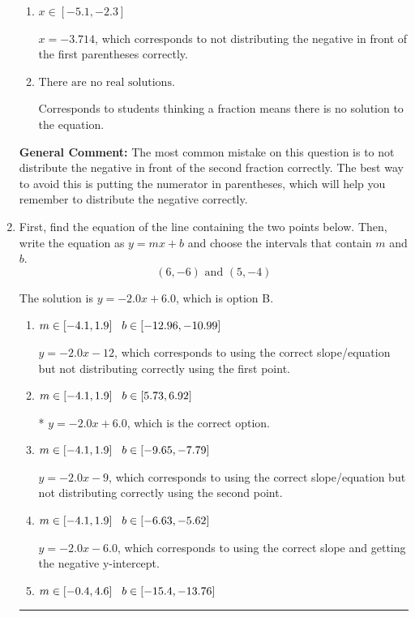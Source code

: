 \documentclass{extbook}[14pt]
\newcommand{\litem}[1]{\item #1

\rule{\textwidth}{0.4pt}}
\begin{document}
\begin{enumerate}
{\begin{enumerate}[label=\Alph*.]
$x = 3.714$, which corresponds to not distributing the negative in front of the second parentheses correctly.
\item \( x \in [-5.1, -2.3] \)

$x = -3.714$, which corresponds to not distributing the negative in front of the first parentheses correctly.
\item \( \text{There are no real solutions.} \)

Corresponds to students thinking a fraction means there is no solution to the equation.
\end{enumerate}

\textbf{General Comment:} The most common mistake on this question is to not distribute the negative in front of the second fraction correctly. The best way to avoid this is putting the numerator in parentheses, which will help you remember to distribute the negative correctly.
}
\litem{
First, find the equation of the line containing the two points below. Then, write the equation as $ y=mx+b $ and choose the intervals that contain $m$ and $b$.
\[ (6, -6) \text{ and } (5, -4) \]

The solution is \( y = -2.0x + 6.0 \), which is option B.\begin{enumerate}[label=\Alph*.]
\item \( m \in [-4.1, 1.9] \hspace*{3mm} b \in [-12.96, -10.99] \)

 $y = -2.0x -12$, which corresponds to using the correct slope/equation but not distributing correctly using the first point.
\item \( m \in [-4.1, 1.9] \hspace*{3mm} b \in [5.73, 6.92] \)

* $y = -2.0x + 6.0$, which is the correct option.
\item \( m \in [-4.1, 1.9] \hspace*{3mm} b \in [-9.65, -7.79] \)

 $y = -2.0x -9$, which corresponds to using the correct slope/equation but not distributing correctly using the second point.
\item \( m \in [-4.1, 1.9] \hspace*{3mm} b \in [-6.63, -5.62] \)

 $y = -2.0x -6.0$, which corresponds to using the correct slope and getting the negative y-intercept.
\item \( m \in [-0.4, 4.6] \hspace*{3mm} b \in [-15.4, -13.76] \)


\end{enumerate}}
\end{enumerate}
\end{document}
